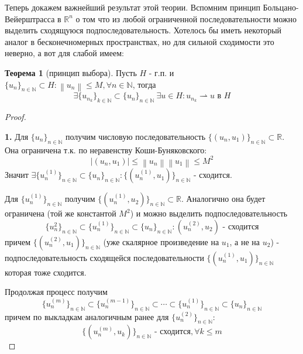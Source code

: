 \documentclass[12pt,a4paper]{article}
\theoremstyle{definition}
\newtheorem{theorem}{Теорема}
\newcommand{\Real}{\mathbb{R}}
\newcommand{\Natural}{\mathbb{N}}
\newcommand{\norm}[1]{\left\lVert#1\right\rVert}
\newcommand{\seq}[2]{\{#1\}_{#2}}
\newcommand{\weakto}{\rightharpoonup}
\begin{document}
Теперь докажем важнейший результат этой теории. Вспомним принцип Больцано-Вейерштрасса в $\Real^n$ о том что из любой ограниченной последовательности можно выделить сходящуюся подпоследовательность. Хотелось бы иметь некоторый аналог в бесконечномерных пространствах, но для сильной сходимости это неверно, а вот для слабой имеем:
\begin{theorem}[принцип выбора]
	Пусть $H$ - г.п. и \\ $\seq{u_n}{n \in \Natural} \subset H: \norm{u_n} \leq M, \forall n \in \Natural$, тогда 
	$$\exists \seq{u_{n_k}}{k \in \Natural} \subset \seq{u_n}{n \in \Natural} \ \exists u \in H: u_{n_k} \weakto u \text{ в } H$$
\end{theorem}
\begin{proof}
	$ $ \newline
	
	\textbf{1.} Для $\seq{u_n}{n \in \Natural}$ получим числовую последовательность $\seq{(u_n, u_1)}{n\in\Natural} \subset \Real$. Она ограничена т.к. по неравенству Коши-Буняковского:
	$$|(u_n, u_1)| \leq \norm{u_n} \norm{u_1} \leq M^2$$
	Значит $\exists \seq{u_n^{(1)}}{n\in\Natural} \subset \seq{u_n}{n\in\Natural}: \seq{(u_n^{(1)}, u_1)}{n\in\Natural} \text{ - сходится}$.
	
	Для $\seq{u_n^{(1)}}{n\in\Natural}$ получим $\seq{(u_n^{(1)}, u_2)}{n\in\Natural} \subset \Real$. Аналогично она будет ограничена (той же константой $M^2$) и можно выделить подпоследовательность 
	$$\seq{u_n^{2}}{n\in\Natural} \subset \seq{u_n^{(1)}}{n\in\Natural} \subset \seq{u_n}{n \in \Natural}: (u_n^{(2)}, u_2) \text{ - сходится}$$
	причем $\seq{(u_n^{(2)}, u_1)}{n\in\Natural}$ (уже скалярное произведение на $u_1$, а не на $u_2$) - подпоследовательность сходящейся последовательности $\seq{(u_n^{(1)}, u_1)}{n\in\Natural}$ которая тоже сходится.
	
	Продолжая процесс получим 
	\begin{equation*}
		\seq{u_n^{(m)}}{n \in \Natural} \subset \seq{u_n^{(m-1)}}{n \in \Natural} \subset \cdots \subset \seq{u_n^{(1)}}{n \in \Natural} \subset \seq{u_n}{n \in \Natural}
	\end{equation*}
	причем по выкладкам аналогичным ранее для $\seq{u_n^{(2)}}{n\in\Natural}$:
	\begin{equation*}
		\seq{(u_n^{(m)}, u_k)}{n\in\Natural} \text{ - сходится}, \forall k \leq m
	\end{equation*}
	

\end{proof}
\end{document}
